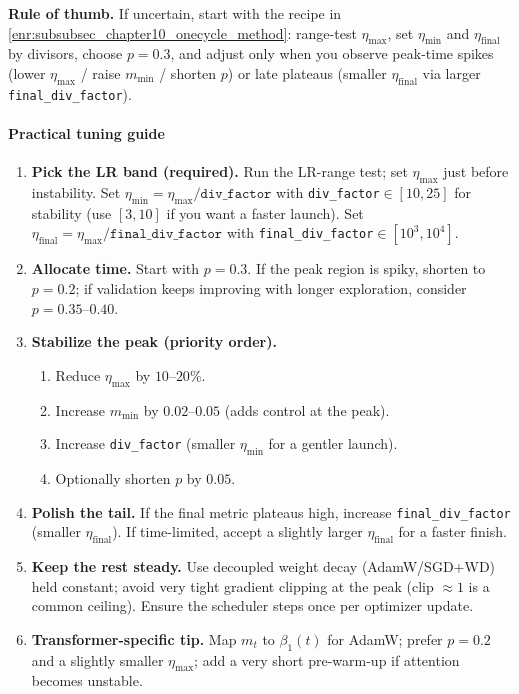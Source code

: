 \begin{enrichment}
	\medskip
	\noindent\textbf{Rule of thumb.} If uncertain, start with the recipe in \autoref{enr:subsubsec_chapter10_onecycle_method}: range-test $\eta_{\max}$, set $\eta_{\min}$ and $\eta_{\text{final}}$ by divisors, choose $p{=}0.3$, and adjust only when you observe peak-time spikes (lower $\eta_{\max}$ / raise $m_{\min}$ / shorten $p$) or late plateaus (smaller $\eta_{\text{final}}$ via larger \texttt{final\_div\_factor}).
	
	\paragraph{Practical tuning guide}
	\begin{enumerate}
		\item \textbf{Pick the LR band (required).} Run the LR-range test; set $\eta_{\max}$ just before instability. Set $\eta_{\min}=\eta_{\max}/\texttt{div\_factor}$ with \texttt{div\_factor}$\in[10,25]$ for stability (use $[3,10]$ if you want a faster launch). Set $\eta_{\text{final}}=\eta_{\max}/\texttt{final\_div\_factor}$ with \texttt{final\_div\_factor}$\in[10^3,10^4]$.
		\item \textbf{Allocate time.} Start with $p{=}0.3$. If the peak region is spiky, shorten to $p{=}0.2$; if validation keeps improving with longer exploration, consider $p{=}0.35$–$0.40$.
		\item \textbf{Stabilize the peak (priority order).} 
		\begin{enumerate}
			\item Reduce $\eta_{\max}$ by $10$–$20\%$.
			\item Increase $m_{\min}$ by $0.02$–$0.05$ (adds control at the peak).
			\item Increase \texttt{div\_factor} (smaller $\eta_{\min}$ for a gentler launch).
			\item Optionally shorten $p$ by $0.05$.
		\end{enumerate}
		\item \textbf{Polish the tail.} If the final metric plateaus high, increase \texttt{final\_div\_factor} (smaller $\eta_{\text{final}}$). If time-limited, accept a slightly larger $\eta_{\text{final}}$ for a faster finish.
		\item \textbf{Keep the rest steady.} Use decoupled weight decay (AdamW/SGD+WD) held constant; avoid very tight gradient clipping at the peak (clip $\approx 1$ is a common ceiling). Ensure the scheduler steps once per optimizer update.
		\item \textbf{Transformer-specific tip.} Map $m_t$ to $\beta_1(t)$ for AdamW; prefer $p{=}0.2$ and a slightly smaller $\eta_{\max}$; add a very short pre-warm-up if attention becomes unstable.
	\end{enumerate}

\end{enrichment}

